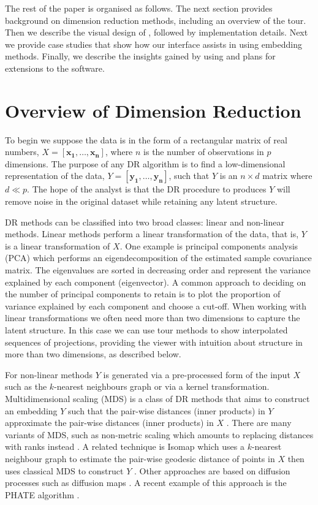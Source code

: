 \documentclass[article,notitle]{jdssv}
\begin{document}
The rest of the paper is organised as follows. The next section provides
background on dimension reduction methods, including an overview of the tour.
Then we describe the visual design of , followed by implementation
details. Next we provide case studies that show how our interface assists
in using embedding methods. Finally, we describe the insights gained by using
 and plans for extensions to the software.

\hypertarget{overview-of-dimension-reduction}{%
\section{Overview of Dimension Reduction}\label{overview-of-dimension-reduction}}

To begin we suppose the data is in the form of a rectangular
matrix of real numbers, \(X = [\mathbf{x_1}, \dots, \mathbf{x_n}]\), where \(n\) is
the number of observations in \(p\) dimensions. The purpose of any DR algorithm
is to find a low-dimensional representation of the data,
\(Y = [\mathbf{y_1}, \dots, \mathbf{y_n}]\), such that \(Y\) is an \(n \times d\)
matrix where \(d \ll p\). The hope of the analyst is that the DR procedure to
produces \(Y\) will remove noise in the original dataset while retaining any
latent structure.

DR methods can be classified into two broad classes: linear and non-linear
methods. Linear methods perform a linear transformation of the data, that is,
\(Y\) is a linear transformation of \(X\). One example is principal components
analysis (PCA) which performs an eigendecomposition of the estimated sample
covariance matrix. The eigenvalues are sorted in decreasing order and represent
the variance explained by each component (eigenvector).
A common approach to deciding on the number of principal components to retain is
to plot the proportion of variance explained by each component and choose a
cut-off.
When working with linear transformations we often need more than two dimensions
to capture the latent structure. In this case we can use tour methods
\citep{Asimov1985-vp, Buja1986-zr} to show interpolated sequences of projections,
providing the viewer with intuition about structure in more than two
dimensions, as described below.

For non-linear methods \(Y\) is generated via a pre-processed form of the input
\(X\) such as the \(k\)-nearest neighbours graph or via a kernel transformation.
Multidimensional scaling (MDS) is a class of DR methods that aims to construct
an embedding \(Y\) such that the pair-wise distances (inner products) in \(Y\)
approximate the pair-wise distances (inner products) in \(X\)
\citep{Torgerson1952-am, Kruskal1964-cz}. There are many
variants of MDS, such as non-metric scaling which amounts to replacing
distances with ranks instead \citep{Kruskal1964-cw}.
A related technique is Isomap which uses a \(k\)-nearest neighbour graph
to estimate the pair-wise geodesic distance of points in \(X\) then uses classical
MDS to construct \(Y\) \citep{Silva2003-xw}. Other approaches are based on diffusion
processes such as diffusion maps \citep{Coifman2005-ak}. A recent example of this
approach is the PHATE algorithm \citep{Moon2019-ce}.
\end{document}
